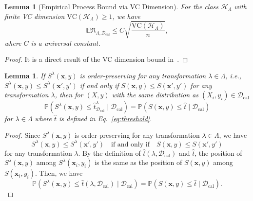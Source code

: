 \documentclass{article}
\renewcommand{\P}{\mathbb{P}}
\newcommand{\E}{\mathbb{E}}
\newcommand{\1}{\mathbbm{1}}
\newcommand{\Eqref}[1]{Eq.~\eqref{#1}}
\theoremstyle{plain}
\newtheorem{lemma}[theorem]{Lemma}
\theoremstyle{definition}
\theoremstyle{remark}
\begin{document}
\begin{lemma}[Empirical Process Bound via VC Dimension]
    \label{lemma:infinite_parameter_empirical_process}
    For the class $\mathcal{H}_{\Lambda}$ with finite VC dimension $\text{VC}(\mathcal{H}_{\Lambda}) \geq 1$, we have
    \begin{equation*}
        \E \mathfrak{R}_{\Lambda, \mathcal{D}_{\text{cal}}} \leq C\sqrt{\frac{\text{VC}(\mathcal{H}_{\Lambda})}{n}},
    \end{equation*}
    where $C$ is a universal constant.
\end{lemma}
\begin{proof}
    It is a direct result of the VC dimension bound in~\citet[Theorem 8.3.23]{vershynin2018highdimensional}.
\end{proof}

\begin{lemma}
    \label{lemma:order_preserving_score}
    If \(S^\lambda(\boldsymbol{x},y)\) is order-preserving for any transformation \(\lambda \in \Lambda\), i.e., \(S^\lambda(\boldsymbol{x},y) \leq S^\lambda(\boldsymbol{x}',y')\) if and only if \(S(\boldsymbol{x},y) \leq S(\boldsymbol{x}',y')\) for any transformation \(\lambda\), then for $(X,y)$ with the same distribution as $(X_i, y_i) \in \mathcal{D}_{\text{cal}}$
    \begin{equation*}
        \P(S^{\lambda}(\boldsymbol{x},y) \leq \hat{t}^\lambda_{\mathcal{D}_{\text{cal}}} \mid \mathcal{D}_{\text{cal}}) = \P(S(\boldsymbol{x},y) \leq \hat{t} \mid \mathcal{D}_{\text{cal}})
    \end{equation*}
    for \(\lambda \in \Lambda\) where \(\hat{t}\) is defined in \Eqref{eq:threshold}.
\end{lemma}

\begin{proof}
    Since \(S^\lambda(\boldsymbol{x},y)\) is order-preserving for any transformation \(\lambda \in \Lambda\), we have 
    \begin{equation*}
        S^\lambda(\boldsymbol{x},y) \leq S^\lambda(\boldsymbol{x}',y') \quad \text{if and only if} \quad S(\boldsymbol{x},y) \leq S(\boldsymbol{x}',y')
    \end{equation*}
    for any transformation \(\lambda\). By the definition of \(\hat{t}(\lambda, \mathcal{D}_{\text{cal}})\) and \(\hat{t}\), the position of \(S^{\lambda}(\boldsymbol{x},y)\) among \(S^{\lambda}(\boldsymbol{x}_i, y_i)\) is the same as the position of \(S(\boldsymbol{x},y)\) among \(S(\boldsymbol{x}_i, y_i)\). Then, we have
    \begin{equation*}
        \P(S^{\lambda}(\boldsymbol{x},y) \leq \hat{t}(\lambda, \mathcal{D}_{\text{cal}}) \mid \mathcal{D}_{\text{cal}}) 
        = \P(S(\boldsymbol{x},y) \leq \hat{t} \mid \mathcal{D}_{\text{cal}}).
    \end{equation*}
\end{proof}
\end{document}
